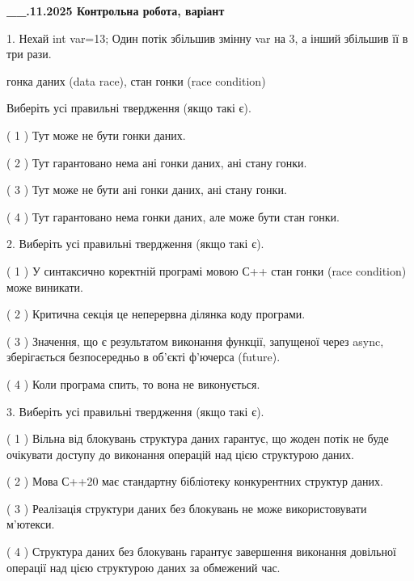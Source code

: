 \documentclass[12pt, ukrainian]{article}
\begin{document}
\newpage
\begin {large}

\textbf{\_\_.11.2025 Контрольна робота, варіант  }\par


{
1. Нехай int var=13; Один потік збільшив змінну var на 3, а інший збільшив її в три рази.

гонка даних (data race), стан гонки (race condition)

Виберіть усі правильні твердження (якщо такі є).\par
\vspace{2mm}
( 1 ) Тут може не бути гонки даних.%

( 2 ) Тут гарантовано нема ані гонки даних, ані стану гонки.%

( 3 ) Тут може не бути ані гонки даних, ані стану гонки.%

( 4 ) Тут гарантовано нема гонки даних, але може бути стан гонки.%


2. Виберіть усі правильні твердження (якщо такі є).\par
\vspace{2mm}

( 1 ) У синтаксично коректній програмі мовою С++ стан гонки (race condition) може виникати.%

( 2 ) Критична секція це неперервна ділянка коду програми.%

( 3 ) Значення, що є результатом виконання функції, запущеної через async, зберігається безпосередньо в об’єкті ф’ючерса (future).%

( 4 ) Коли програма спить, то вона не виконується.%


3. Виберіть усі правильні твердження (якщо такі є).\par
\vspace{2mm}

( 1 ) Вільна від блокувань структура даних гарантує, що жоден потік не буде очікувати доступу до виконання операцій над цією структурою даних.%

( 2 ) Мова С++20 має стандартну бібліотеку конкурентних структур даних.%

( 3 ) Реалізація структури даних без блокувань не може використовувати м’ютекси.%

( 4 ) Структура даних без блокувань гарантує завершення виконання довільної операції над цією структурою даних за обмежений час.%


}
\end{large}
\end{document}
